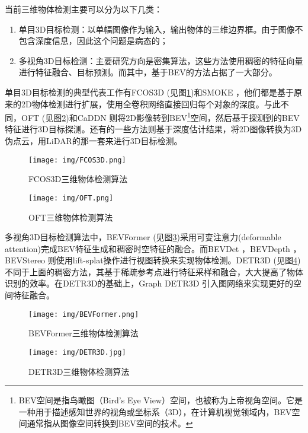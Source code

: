 \documentclass[12pt, twocolumn]{article}
\newcommand\normf{\fangsong}
\begin{document}
	当前三维物体检测主要可以分为以下几类：
	\begin{enumerate}
	\item 单目3D目标检测：以单幅图像作为输入，输出物体的三维边界框。由于图像不包含深度信息，因此这个问题是病态的；
	
	\item 多视角3D目标检测：主要研究方向是密集算法，这些方法使用稠密的特征向量进行特征融合、目标预测。而其中，基于BEV的方法占据了一大部分。
	\end{enumerate}
	单目3D目标检测的典型代表工作有FCOS3D \cite{wang2021fcos3d} (见图\ref{fig:FCOS3D三维物体检测算法})和SMOKE \cite{liu2020smoke}，他们都是基于原来的2D物体检测进行扩展，使用全卷积网络直接回归每个对象的深度。与此不同，OFT (见图\ref{fig:OFT三维物体检测算法})和CaDDN \cite{reading2021categorical} 则将2D影像转到BEV\footnote{\normf BEV空间是指鸟瞰图（Bird’s Eye View）空间，也被称为上帝视角空间。它是一种用于描述感知世界的视角或坐标系（3D），在计算机视觉领域内，BEV空间通常指从图像空间转换到BEV空间的技术。}空间，然后基于探测到的BEV特征进行3D目标探测。还有的一些方法则基于深度估计结果，将2D图像转换为3D伪点云，用LiDAR的那一套来进行3D目标检测。

	\begin{figure}[h]
		\centering
		\texttt{[image: img/FCOS3D.png]}
		\caption{\normf FCOS3D三维物体检测算法}
		\label{fig:FCOS3D三维物体检测算法}
	\end{figure}
	\begin{figure}[h]
		\centering
		\texttt{[image: img/OFT.png]}
		\caption{\normf OFT三维物体检测算法}
		\label{fig:OFT三维物体检测算法}
	\end{figure}
	
	多视角3D目标检测算法中，BEVFormer \cite{li2022bevformer} (见图\ref{fig:BEVFormer三维物体检测算法})采用可变注意力(deformable attention)完成BEV特征生成和稠密时空特征的融合。而BEVDet \cite{huang2021bevdet}，BEVDepth \cite{li2023bevdepth}，BEVStereo \cite{li2023bevstereo}则使用lift-splat操作进行视图转换来实现物体检测。DETR3D \cite{wang2022detr3d} (见图\ref{fig:DETR3D三维物体检测算法})不同于上面的稠密方法，其基于稀疏参考点进行特征采样和融合，大大提高了物体识别的效率。在DETR3D的基础上，Graph DETR3D \cite{chen2022graph} 引入图网络来实现更好的空间特征融合。
	\begin{figure}[h]
		\centering
		\texttt{[image: img/BEVFormer.png]}
		\caption{\normf BEVFormer三维物体检测算法}
		\label{fig:BEVFormer三维物体检测算法}
	\end{figure}
	\begin{figure}[h]
		\centering
		\texttt{[image: img/DETR3D.jpg]}
		\caption{\normf DETR3D三维物体检测算法}
		\label{fig:DETR3D三维物体检测算法}
	\end{figure}
	
\end{document}
